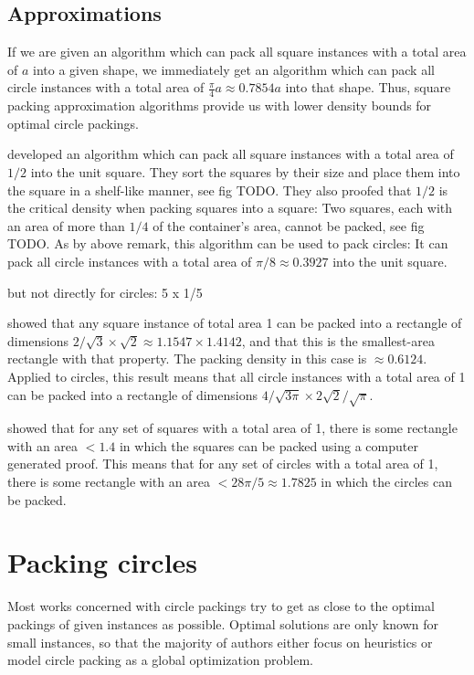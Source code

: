 \documentclass[a4paper,style=print,bibliography=totoc,nexus,lnum,extramargin]{tubsbook}
\begin{document}
\subsection{Approximations}

If we are given an algorithm which can pack all square instances with a total area of $a$ into a given shape, we immediately get an algorithm which can pack all circle instances with a total area of $\frac{\pi}{4}a \approx 0.7854a$ into that shape. Thus, square packing approximation algorithms provide us with lower density bounds for optimal circle packings.

\textcite{MM1967some} developed an algorithm which can pack all square instances with a total area of $1/2$ into the unit square.
They sort the squares by their size and place them into the square in a shelf-like manner, see fig TODO.
They also proofed that $1/2$ is the critical density when packing squares into a square: Two squares, each with an area of more than $1/4$ of the container's area, cannot be packed, see fig TODO.
As by above remark, this algorithm can be used to pack circles: It can pack all circle instances with a total area of $\pi/8 \approx 0.3927$ into the unit square.

but not directly for circles: 5 x 1/5

\textcite{KK1975optimal} showed that any square instance of total area 1 can be packed into a rectangle of dimensions $2/\sqrt{3} \times \sqrt{2} \approx 1.1547 \times 1.4142$, and that this is the smallest-area rectangle with that property. The packing density in this case is $\approx 0.6124$. Applied to circles, this result means that all circle instances with a total area of 1 can be packed into a rectangle of dimensions $4/\sqrt{3\pi} \times 2\sqrt{2}/\sqrt{\pi}$.

\textcite{hougardy2011packing} showed that for any set of squares with a total area of 1, there is some rectangle with an area $< 1.4$ in which the squares can be packed using a computer generated proof. This means that for any set of circles with a total area of 1, there is some rectangle with an area $< 28\pi/5 \approx 1.7825$ in which the circles can be packed.

\section{Packing circles}

Most works concerned with circle packings try to get as close to the optimal packings of given instances as possible. Optimal solutions are only known for small instances, so that the majority of authors either focus on heuristics or model circle packing as a global optimization problem.
\end{document}
